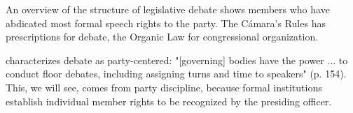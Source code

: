 \documentclass[letter,12pt]{article}
\begin{document}


An overview of the structure of legislative debate shows members who have abdicated most formal speech rights to the party. The Cámara's Rules \citep{reglamentoDipMx.2019} has prescriptions for debate, the Organic Law \citep{loceum.2019} for congressional organization.

\citet{casar.agsetting.2016} characterizes debate as party-centered: "[governing] bodies have the power ... to conduct floor debates, including assigning turns and time to speakers" (p. 154). This, we will see, comes from party discipline, because formal institutions establish individual member rights to be recognized by the presiding officer.
\end{document}
